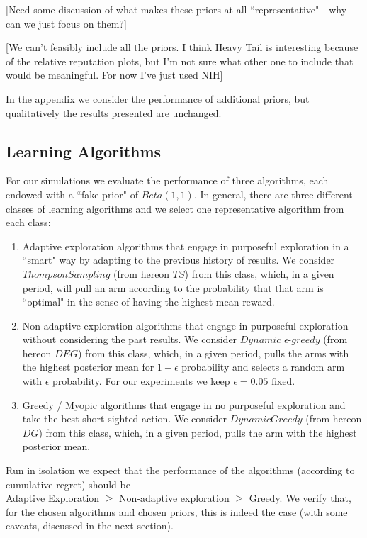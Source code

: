 \documentclass{article}
\theoremstyle{definition}
\begin{document}
[Need some discussion of what makes these priors at all ``representative" - why can we just focus on them?]

[We can't feasibly include all the priors. I think Heavy Tail is interesting because of the relative reputation plots, but I'm not sure what other one to include that would be meaningful. For now I've just used NIH]

In the appendix we consider the performance of additional priors, but qualitatively the results presented are unchanged.

\subsection{Learning Algorithms}

For our simulations we evaluate the performance of three algorithms, each endowed with a ``fake prior" of $Beta(1, 1)$. In general, there are three different classes of learning algorithms and we select one representative algorithm from each class: 
\begin{enumerate}
\item Adaptive exploration algorithms that engage in purposeful exploration in a ``smart" way by adapting to the previous history of results. We consider $Thompson Sampling$ (from hereon $TS$) from this class, which, in a given period, will pull an arm according to the probability that that arm is ``optimal" in the sense of having the highest mean reward.
\item Non-adaptive exploration algorithms that engage in purposeful exploration without considering the past results. We consider $Dynamic$ $\epsilon$-$greedy$ (from hereon $DEG$) from this class, which, in a given period, pulls the arms with the highest posterior mean for $1 - \epsilon$ probability and selects a random arm with $\epsilon$ probability. For our experiments we keep $\epsilon = 0.05$ fixed.
\item Greedy / Myopic algorithms that engage in no purposeful exploration and take the best short-sighted action. We consider $DynamicGreedy$ (from hereon $DG$) from this class, which, in a given period, pulls the arm with the highest posterior mean.
\end{enumerate}

Run in isolation we expect that the performance of the algorithms (according to cumulative regret) should be \\
 Adaptive Exploration $\geq$ Non-adaptive exploration $\geq$ Greedy. We verify that, for the chosen algorithms and chosen priors, this is indeed the case (with some caveats, discussed in the next section).
\end{document}

